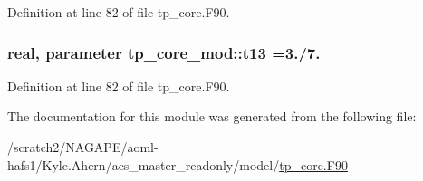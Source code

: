 Definition at line 82 of file tp\-\_\-core.\-F90.

\subsubsection[{t13}]{\setlength{\rightskip}{0pt plus 5cm}real, parameter tp\-\_\-core\-\_\-mod\-::t13 =3./7.\hspace{0.3cm}{\ttfamily [private]}}\label{classtp__core__mod_a84fa887f4b8538ed2c628be08aeea165}


Definition at line 82 of file tp\-\_\-core.\-F90.



The documentation for this module was generated from the following file\-:\begin{DoxyCompactItemize}
\item 
/scratch2/\-N\-A\-G\-A\-P\-E/aoml-\/hafs1/\-Kyle.\-Ahern/acs\-\_\-master\-\_\-readonly/model/\hyperlink{tp__core_8F90}{tp\-\_\-core.\-F90}\end{DoxyCompactItemize}
